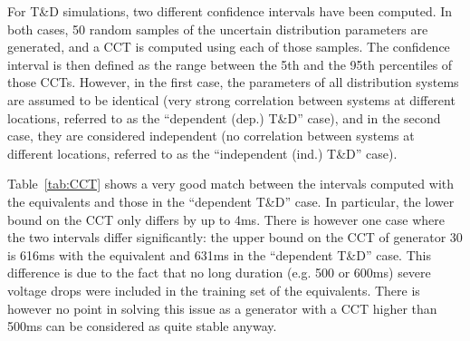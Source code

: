 
For T\&D simulations, two different confidence intervals have been computed. In both cases, 50 random samples of the uncertain distribution parameters are generated, and a CCT is computed using each of those samples. The confidence interval is then defined as the range between the 5th and the 95th percentiles of those CCTs. However, in the first case, the parameters of all distribution systems are assumed to be identical (very strong correlation between systems at different locations, referred to as the ``dependent (dep.) T\&D'' case), and in the second case, they are considered independent (no correlation between systems at different locations, referred to as the ``independent (ind.) T\&D'' case).

Table~\ref{tab:CCT} shows a very good match between the intervals computed with the equivalents and those in the ``dependent T\&D'' case. In particular, the lower bound on the CCT only differs by up to 4ms. There is however one case where the two intervals differ significantly: the upper bound on the CCT of generator 30 is 616ms with the equivalent and 631ms in the ``dependent T\&D'' case. This difference is due to the fact that no long duration (e.g. 500 or 600ms) severe voltage drops were included in the training set of the equivalents. There is however no point in solving this issue as a generator with a CCT higher than 500ms can be considered as quite stable anyway.

